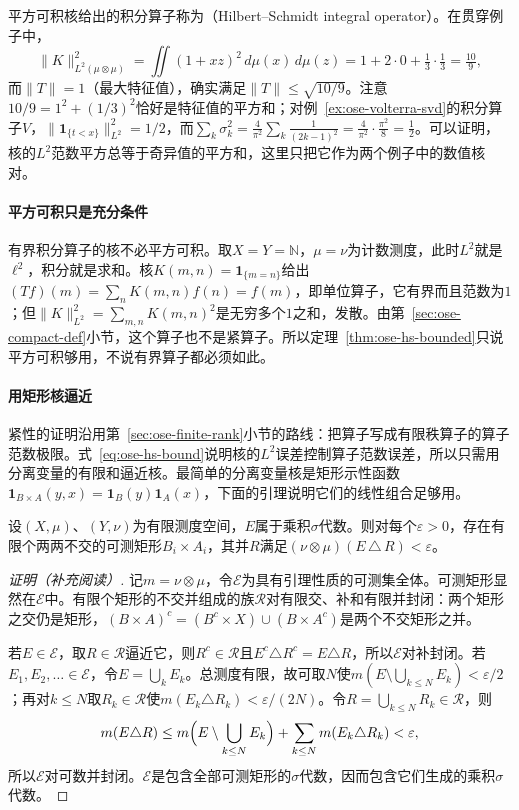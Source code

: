 平方可积核给出的积分算子称为（Hilbert--Schmidt integral operator）。在贯穿例子中，
\[
  \|K\|_{L^2(\mu\otimes\mu)}^2=\iint(1+xz)^2\,d\mu(x)\,d\mu(z)=1+2\cdot0+\tfrac13\cdot\tfrac13=\tfrac{10}{9},
\]
而$\|T\|=1$（最大特征值），确实满足$\|T\|\leq\sqrt{10/9}$。注意$10/9=1^2+(1/3)^2$恰好是特征值的平方和；对例~\ref{ex:ose-volterra-svd}的积分算子$V$，$\|\mathbf 1_{\{t<x\}}\|_{L^2}^2=1/2$，而$\sum_k\sigma_k^2=\frac{4}{\pi^2}\sum_k\frac{1}{(2k-1)^2}=\frac{4}{\pi^2}\cdot\frac{\pi^2}{8}=\frac12$。可以证明，核的$L^2$范数平方总等于奇异值的平方和，这里只把它作为两个例子中的数值核对。

\paragraph{平方可积只是充分条件}
有界积分算子的核不必平方可积。取$X=Y=\mathbb N$，$\mu=\nu$为计数测度，此时$L^2$就是$\ell^2$，积分就是求和。核$K(m,n)=\mathbf 1_{\{m=n\}}$给出$(Tf)(m)=\sum_nK(m,n)f(n)=f(m)$，即单位算子，它有界而且范数为$1$；但$\|K\|_{L^2}^2=\sum_{m,n}K(m,n)^2$是无穷多个$1$之和，发散。由第~\ref{sec:ose-compact-def}小节，这个算子也不是紧算子。所以定理~\ref{thm:ose-hs-bounded}只说平方可积够用，不说有界算子都必须如此。

\paragraph{用矩形核逼近}
紧性的证明沿用第~\ref{sec:ose-finite-rank}小节的路线：把算子写成有限秩算子的算子范数极限。式~\eqref{eq:ose-hs-bound}说明核的$L^2$误差控制算子范数误差，所以只需用分离变量的有限和逼近核。最简单的分离变量核是矩形示性函数$\mathbf 1_{B\times A}(y,x)=\mathbf 1_B(y)\mathbf 1_A(x)$，下面的引理说明它们的线性组合足够用。

\begin{lemma}[矩形逼近]
\label{lem:ose-rectangle-approx}
设$(X,\mu)$、$(Y,\nu)$为有限测度空间，$E$属于乘积$\sigma$代数。则对每个$\varepsilon>0$，存在有限个两两不交的可测矩形$B_i\times A_i$，其并$R$满足$(\nu\otimes\mu)(E\,\triangle\,R)<\varepsilon$。
\end{lemma}

\begin{proof}[证明（补充阅读）]
记$m=\nu\otimes\mu$，令$\mathcal E$为具有引理性质的可测集全体。可测矩形显然在$\mathcal E$中。有限个矩形的不交并组成的族$\mathcal R$对有限交、补和有限并封闭：两个矩形之交仍是矩形，$(B\times A)^c=(B^c\times X)\cup(B\times A^c)$是两个不交矩形之并。

若$E\in\mathcal E$，取$R\in\mathcal R$逼近它，则$R^c\in\mathcal R$且$E^c\triangle R^c=E\triangle R$，所以$\mathcal E$对补封闭。若$E_1,E_2,\ldots\in\mathcal E$，令$E=\bigcup_kE_k$。总测度有限，故可取$N$使$m(E\setminus\bigcup_{k\leq N}E_k)<\varepsilon/2$；再对$k\leq N$取$R_k\in\mathcal R$使$m(E_k\triangle R_k)<\varepsilon/(2N)$。令$R=\bigcup_{k\leq N}R_k\in\mathcal R$，则
\[
  m(E\triangle R)\leq m\Bigl(E\setminus\bigcup_{k\leq N}E_k\Bigr)+\sum_{k\leq N}m(E_k\triangle R_k)<\varepsilon ,
\]
所以$\mathcal E$对可数并封闭。$\mathcal E$是包含全部可测矩形的$\sigma$代数，因而包含它们生成的乘积$\sigma$代数。
\end{proof}


